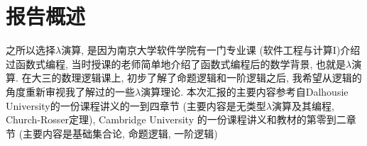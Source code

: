 \newpage
\section{报告概述}
之所以选择$\lambda$演算, 是因为南京大学软件学院有一门专业课 (软件工程与计算I)介绍过函数式编程, 当时授课的老师简单地介绍了函数式编程后的数学背景, 也就是$\lambda$演算. 在大三的数理逻辑课上, 初步了解了命题逻辑和一阶逻辑之后, 我希望从逻辑的角度重新审视我了解过的一些$\lambda$演算理论. 
本次汇报的主要内容参考自Dalhousie University的一份课程讲义\cite{selingerLectureNotesLambda}的一到四章节 (主要内容是无类型$\lambda$演算及其编程, Church-Rosser定理), Cambridge University 的一份课程讲义\cite{henkbarendregtLAMBDACALCULUSTYPES}和教材\cite{herbertMathematicalIntroductionLogic}的第零到二章节 (主要内容是基础集合论, 命题逻辑, 一阶逻辑)